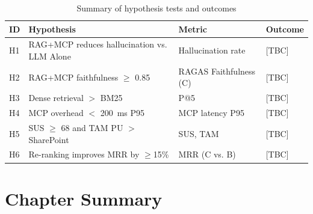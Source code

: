 \begin{table}[H]
\centering
\caption{Summary of hypothesis tests and outcomes}
\label{tab:hypothesis-summary}
\begin{tabularx}{\textwidth}{@{}llXX@{}}
\toprule
\textbf{ID} & \textbf{Hypothesis} & \textbf{Metric} & \textbf{Outcome} \\
\midrule
H1 & RAG+MCP reduces hallucination vs. LLM Alone & Hallucination rate & [TBC] \\
H2 & RAG+MCP faithfulness $\geq$ 0.85 & RAGAS Faithfulness (C) & [TBC] \\
H3 & Dense retrieval $>$ BM25 & P@5 & [TBC] \\
H4 & MCP overhead $<$ 200~ms P95 & MCP latency P95 & [TBC] \\
H5 & SUS $\geq$ 68 and TAM PU $>$ SharePoint & SUS, TAM & [TBC] \\
H6 & Re-ranking improves MRR by $\geq$15\% & MRR (C vs. B) & [TBC] \\
\bottomrule
\end{tabularx}
\end{table}


\section{Chapter Summary}
\label{sec:eval-summary}

